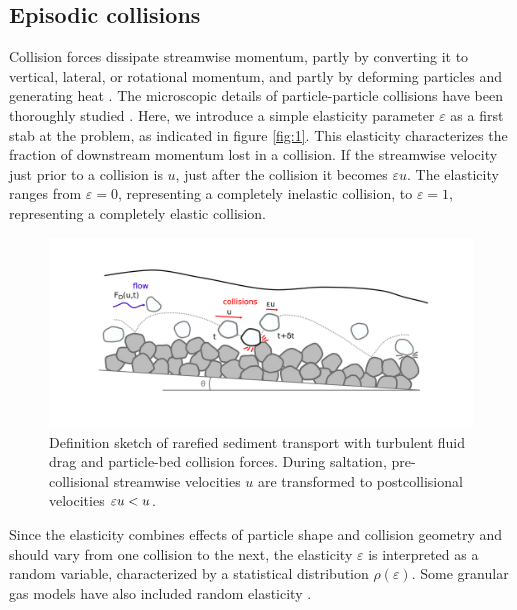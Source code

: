 \subsection{Episodic collisions}
Collision forces dissipate streamwise momentum, partly by converting it to vertical, lateral, or rotational momentum, and partly by deforming particles and generating heat \citep{Schmeeckle2014,Williams2021}.
The microscopic details of particle-particle collisions have been thoroughly studied \citep{Brach1989, Lorenz1997,Montaine2011}. Here, we introduce a simple elasticity parameter $\varepsilon$ as a first stab at the problem, as indicated in figure \ref{fig:1}. This elasticity characterizes the fraction of downstream momentum lost in a collision. If the streamwise velocity just prior to a collision is $u$, just after the collision it becomes $\varepsilon u$. The elasticity ranges from $\varepsilon=0$, representing a completely inelastic collision, to $\varepsilon=1$, representing a completely elastic collision.
\begin{figure}
	\centerline{\includegraphics{./figures/ch5/Fig1Concept.png}}
	\caption{Definition sketch of rarefied sediment transport with turbulent fluid drag and particle-bed collision forces. During saltation, pre-collisional streamwise velocities $u$ are transformed to postcollisional velocities $\varepsilon u < u$.}
	\label{fig:fig1}
\end{figure}

Since the elasticity combines effects of particle shape and collision geometry and should vary from one collision to the next, the elasticity $\varepsilon$ is interpreted as a random variable, characterized by a statistical distribution $\rho(\varepsilon)$.
Some granular gas models have also included random elasticity \citep[e.g.][]{Serero2015}.

